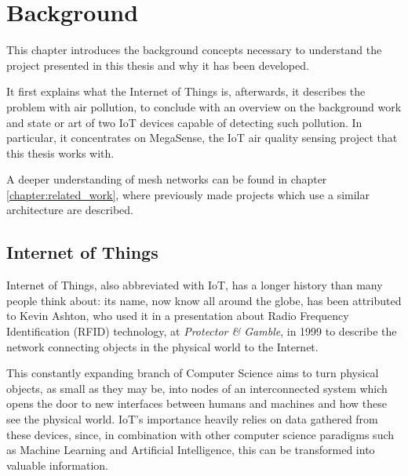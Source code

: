 

\chapter{Background}\label{chapter:background}

	This chapter introduces the background concepts necessary to understand the project presented in this thesis and why it has been developed.
	
	It first explains what the Internet of Things is, afterwards, it describes the problem with air pollution, to conclude with an overview on the background work and state or art of two IoT devices capable of detecting such pollution.
	In particular, it concentrates on MegaSense, the IoT air quality sensing project that this thesis works with.

	A deeper understanding of mesh networks can be found in chapter \ref{chapter:related_work}, where previously made projects which use a similar architecture are described.

	\section{Internet of Things}
	
		
		Internet of Things, also abbreviated with IoT, has a longer history than many people think about: its name, now know all around the globe, has been attributed to Kevin Ashton, who used it in a presentation about Radio Frequency Identification (RFID) technology, at \textit{Protector \& Gamble}, in 1999 \cite{iot_definition} to describe the network connecting objects in the physical world to the Internet.
		
		This constantly expanding branch of Computer Science aims to turn physical objects, as small as they may be, into nodes of an interconnected system which opens the door to new interfaces between humans and machines and how these see the physical world.
		IoT's importance heavily relies on data gathered from these devices, since, in combination with other computer science paradigms such as Machine Learning and Artificial Intelligence, this can be transformed into valuable information.
	
